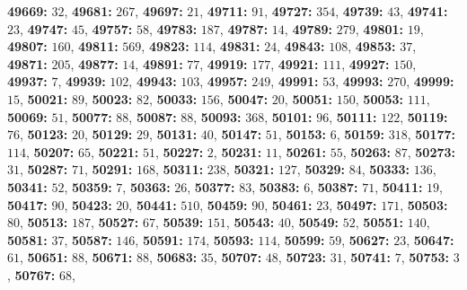 \textsf{\bfseries 49669:} $32$, \textsf{\bfseries 49681:} $267$, \textsf{\bfseries 49697:} $21$, \textsf{\bfseries 49711:} $91$, \textsf{\bfseries 49727:} $354$, \textsf{\bfseries 49739:} $43$, \textsf{\bfseries 49741:} $23$, \textsf{\bfseries 49747:} $45$, \textsf{\bfseries 49757:} $58$, \textsf{\bfseries 49783:} $187$, \textsf{\bfseries 49787:} $14$, \textsf{\bfseries 49789:} $279$, \textsf{\bfseries 49801:} $19$, \textsf{\bfseries 49807:} $160$, \textsf{\bfseries 49811:} $569$, \textsf{\bfseries 49823:} $114$, \textsf{\bfseries 49831:} $24$, \textsf{\bfseries 49843:} $108$, \textsf{\bfseries 49853:} $37$, \textsf{\bfseries 49871:} $205$, \textsf{\bfseries 49877:} $14$, \textsf{\bfseries 49891:} $77$, \textsf{\bfseries 49919:} $177$, \textsf{\bfseries 49921:} $111$, \textsf{\bfseries 49927:} $150$, \textsf{\bfseries 49937:} $7$, \textsf{\bfseries 49939:} $102$, \textsf{\bfseries 49943:} $103$, \textsf{\bfseries 49957:} $249$, \textsf{\bfseries 49991:} $53$, \textsf{\bfseries 49993:} $270$, \textsf{\bfseries 49999:} $15$, \textsf{\bfseries 50021:} $89$, \textsf{\bfseries 50023:} $82$, \textsf{\bfseries 50033:} $156$, \textsf{\bfseries 50047:} $20$, \textsf{\bfseries 50051:} $150$, \textsf{\bfseries 50053:} $111$, \textsf{\bfseries 50069:} $51$, \textsf{\bfseries 50077:} $88$, \textsf{\bfseries 50087:} $88$, \textsf{\bfseries 50093:} $368$, \textsf{\bfseries 50101:} $96$, \textsf{\bfseries 50111:} $122$, \textsf{\bfseries 50119:} $76$, \textsf{\bfseries 50123:} $20$, \textsf{\bfseries 50129:} $29$, \textsf{\bfseries 50131:} $40$, \textsf{\bfseries 50147:} $51$, \textsf{\bfseries 50153:} $6$, \textsf{\bfseries 50159:} $318$, \textsf{\bfseries 50177:} $114$, \textsf{\bfseries 50207:} $65$, \textsf{\bfseries 50221:} $51$, \textsf{\bfseries 50227:} $2$, \textsf{\bfseries 50231:} $11$, \textsf{\bfseries 50261:} $55$, \textsf{\bfseries 50263:} $87$, \textsf{\bfseries 50273:} $31$, \textsf{\bfseries 50287:} $71$, \textsf{\bfseries 50291:} $168$, \textsf{\bfseries 50311:} $238$, \textsf{\bfseries 50321:} $127$, \textsf{\bfseries 50329:} $84$, \textsf{\bfseries 50333:} $136$, \textsf{\bfseries 50341:} $52$, \textsf{\bfseries 50359:} $7$, \textsf{\bfseries 50363:} $26$, \textsf{\bfseries 50377:} $83$, \textsf{\bfseries 50383:} $6$, \textsf{\bfseries 50387:} $71$, \textsf{\bfseries 50411:} $19$, \textsf{\bfseries 50417:} $90$, \textsf{\bfseries 50423:} $20$, \textsf{\bfseries 50441:} $510$, \textsf{\bfseries 50459:} $90$, \textsf{\bfseries 50461:} $23$, \textsf{\bfseries 50497:} $171$, \textsf{\bfseries 50503:} $80$, \textsf{\bfseries 50513:} $187$, \textsf{\bfseries 50527:} $67$, \textsf{\bfseries 50539:} $151$, \textsf{\bfseries 50543:} $40$, \textsf{\bfseries 50549:} $52$, \textsf{\bfseries 50551:} $140$, \textsf{\bfseries 50581:} $37$, \textsf{\bfseries 50587:} $146$, \textsf{\bfseries 50591:} $174$, \textsf{\bfseries 50593:} $114$, \textsf{\bfseries 50599:} $59$, \textsf{\bfseries 50627:} $23$, \textsf{\bfseries 50647:} $61$, \textsf{\bfseries 50651:} $88$, \textsf{\bfseries 50671:} $88$, \textsf{\bfseries 50683:} $35$, \textsf{\bfseries 50707:} $48$, \textsf{\bfseries 50723:} $31$, \textsf{\bfseries 50741:} $7$, \textsf{\bfseries 50753:} $3$, \textsf{\bfseries 50767:} $68$, 

